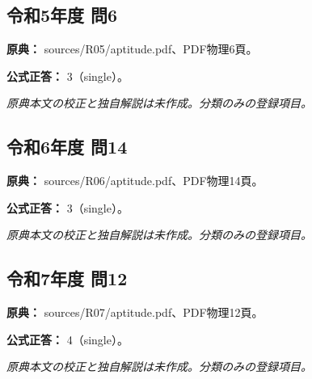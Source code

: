 \subsection{令和5年度 問6}
\label{q:r05-reg-apt-06}

\noindent\textbf{原典：} sources/R05/aptitude.pdf、PDF物理6頁。

\textbf{公式正答：} 3（single）。

\par\textit{原典本文の校正と独自解説は未作成。分類のみの登録項目。}

\subsection{令和6年度 問14}
\label{q:r06-reg-apt-14}

\noindent\textbf{原典：} sources/R06/aptitude.pdf、PDF物理14頁。

\textbf{公式正答：} 3（single）。

\par\textit{原典本文の校正と独自解説は未作成。分類のみの登録項目。}

\subsection{令和7年度 問12}
\label{q:r07-reg-apt-12}

\noindent\textbf{原典：} sources/R07/aptitude.pdf、PDF物理12頁。

\textbf{公式正答：} 4（single）。

\par\textit{原典本文の校正と独自解説は未作成。分類のみの登録項目。}
